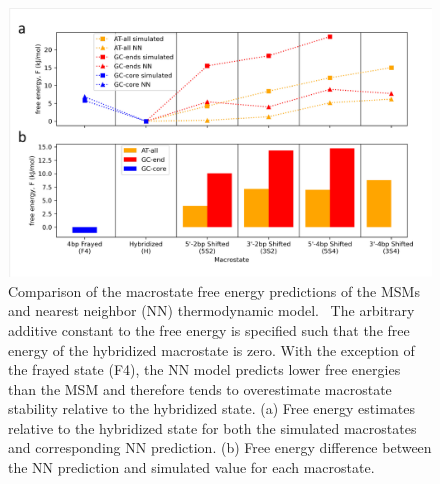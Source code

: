 \documentclass[journal=jpcbfk,manuscript=article]{achemso}
\begin{document}
\begin{figure}[ht!]
	\begin{center} 
        \includegraphics[width=160mm, scale=1]{Fig3.pdf}
        \caption{Comparison of the macrostate free energy predictions of the MSMs and nearest neighbor (NN) thermodynamic model.~\citep{SantaLucia1998AThermodynamics, Santalucia2004TM} The arbitrary additive constant to the free energy is specified such that the free energy of the hybridized macrostate is zero. With the exception of the frayed state (F4), the NN model predicts lower free energies than the MSM and therefore tends to overestimate macrostate stability relative to the hybridized state. (a) Free energy estimates relative to the hybridized state for both the simulated macrostates and corresponding NN prediction. (b) Free energy difference between the NN prediction and simulated value for each macrostate.}
        \label{fig:NN_table}
	\end{center}
\end{figure}
\end{document}
